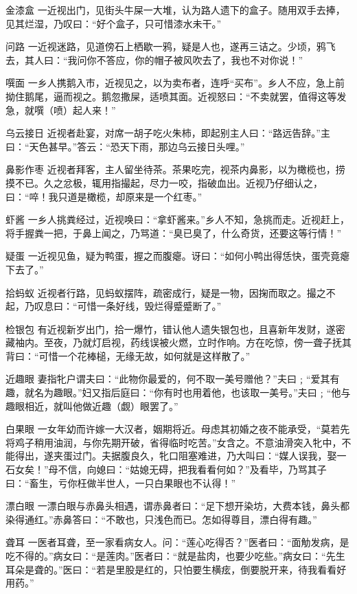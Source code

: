 \documentclass[12pt,UTF8]{ctexbook}
\begin{document}
金漆盒
一近视出门，见街头牛屎一大堆，认为路人遗下的盒子。随用双手去捧，见其烂湿，乃叹曰：“好个盒子，只可惜漆水未干。”

问路
一近视迷路，见道傍石上栖歇一鸦，疑是人也，遂再三诘之。少顷，鸦飞去，其人曰：“我问你不答应，你的帽子被风吹去了，我也不对你说！”

噀面
一乡人携鹅入市，近视见之，以为卖布者，连呼“买布”。乡人不应，急上前拗住鹅尾，逼而视之。鹅忽撒屎，适喷其面。近视怒曰：“不卖就罢，值得这等发急，就噀（喷）起人来！”

乌云接日
近视者赴宴，对席一胡子吃火朱柿，即起别主人曰：“路远告辞。”主曰：“天色甚早。”答云：“恐天下雨，那边乌云接日头哩。”

鼻影作枣
近视者拜客，主人留坐待茶。茶果吃完，视茶内鼻影，以为橄榄也，捞摸不已。久之忿极，辄用指撮起，尽力一咬，指破血出。近视乃仔细认之，曰：“啐！我只道是橄榄，却原来是一个红枣。”

虾酱
一乡人挑粪经过，近视唤曰：“拿虾酱来。”乡人不知，急挑而走。近视赶上，将手握粪一把，于鼻上闻之，乃骂道：“臭已臭了，什么奇货，还要这等行情！”

疑蛋
一近视见鱼，疑为鸭蛋，握之而腹瘪。讶曰：“如何小鸭出得恁快，蛋壳竟瘪下去了。”

拾蚂蚁
近视者行路，见蚂蚁摆阵，疏密成行，疑是一物，因掬而取之。撮之不起，乃叹息曰：“可惜一条好线，毁烂得蹙蹙断了。”

检银包
有近视新岁出门，拾一爆竹，错认他人遗失银包也，且喜新年发财，遂密藏袖内。至夜，乃就灯启视，药线误被火燃，立时作响。方在吃惊，傍一聋子抚其背曰：“可惜一个花棒槌，无缘无故，如何就是这样散了。”

近趣眼
妻指牝户谓夫曰：“此物你最爱的，何不取一美号赠他？”夫曰﹔“爱其有趣，就名为趣眼。”妇又指后庭曰：“你有时也用着他，也该取一美号。”夫曰﹔“他与趣眼相近，就叫他做近趣（觑）眼罢了。”

白果眼
一女年幼而许嫁一大汉者，姻期将近。母虑其初婚之夜不能承受，“莫若先将鸡子稍用油润，与你先期开破，省得临时吃苦。”女含之。不意油滑突入牝中，不能得出，遂夹蛋过门。夫据腹良久，牝口阻塞难进，乃大叫曰：“媒人误我，娶一石女矣！”母不信，向媳曰：“姑媳无碍，把我看看何如？”及看毕，乃骂其子曰：“畜生，亏你枉做半世人，一只白果眼也不认得！”

漂白眼
一漂白眼与赤鼻头相遇，谓赤鼻者曰：“足下想开染坊，大费本钱，鼻头都染得通红。”赤鼻答曰：“不敢也，只浅色而已。怎如得尊目，漂白得有趣。”

聋耳
一医者耳聋，至一家看病女人。问：“莲心吃得否？”医者曰：“面觔发病，是吃不得的。”病女曰：“是莲肉。”医者曰：“就是盐肉，也要少吃些。”病女曰：“先生耳朵是聋的。”医曰：“若是里股是红的，只怕要生横痃，倒要脱开来，待我看看好用药。”
\end{document}
